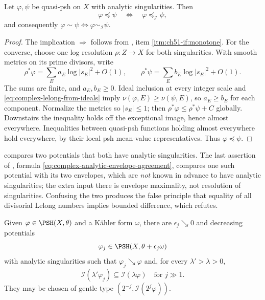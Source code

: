 \begin{proposition}
\label{prop:ch51-analytic-rigid}
Let $\varphi,\psi$ be quasi-psh on $X$ with analytic singularities.
Then
\[
 \varphi\preceq\psi
 \quad\Longleftrightarrow\quad
 \varphi\preceq_{\mathcal I}\psi ,
\]
and consequently $\varphi\sim\psi\iff\varphi\sim_{\mathcal I}\psi$.
\end{proposition}

\begin{proof}
The implication $\Rightarrow$ follows from
, item \cref{itm:ch51-if:monotone}.
For the converse, choose one log resolution $\rho:Z\to X$ for both
singularities.  With smooth metrics on its prime divisors, write
\[
 \rho^*\varphi=\sum_Ea_E\log|s_E|^2+O(1),\qquad
 \rho^*\psi=\sum_Eb_E\log|s_E|^2+O(1).
\]
The sums are finite, and $a_E,b_E\geq0$.  Ideal inclusion at every
integer scale and \eqref{eq:complex-lelong-from-ideals} imply
$\nu(\varphi,E)\geq\nu(\psi,E)$, so $a_E\geq b_E$ for each component.
Normalize the metrics so $|s_E|\leq1$; then
$\rho^*\varphi\leq\rho^*\psi+C$ globally.  Downstairs the inequality
holds off the exceptional image, hence almost everywhere.  Inequalities
between quasi-psh functions holding almost everywhere hold everywhere,
by their local psh mean-value representatives.  Thus
$\varphi\preceq\psi$.
\end{proof}

\begin{remark}
\label{rem:ch51-rigidity}
 compares two potentials that both have
analytic singularities.  The last assertion of
, formula
\eqref{eq:complex-analytic-envelope-agreement}, compares one such
potential with its two envelopes, which are \emph{not} known in advance to
have analytic singularities; the extra input there is envelope maximality,
not resolution of singularities.  Confusing the two produces the false
principle that equality of all divisorial Lelong numbers implies bounded
difference, which  refutes.
\end{remark}

\begin{proposition}\label{prop:complex-quasi-equisingular}
Given $\varphi\in\PSH(X,\theta)$ and a K\"ahler form $\omega$, there
are $\epsilon_j\searrow0$ and decreasing potentials
\[
 \varphi_j\in\PSH(X,\theta+\epsilon_j\omega)
\]
with analytic singularities such that $\varphi_j\searrow\varphi$ and,
for every $\lambda'>\lambda>0$,
\[
 \mathcal I(\lambda'\varphi_j)
          \subseteq\mathcal I(\lambda\varphi)
 \quad\text{for }j\gg1.
\tag{51.14}\label{eq:complex-quasi-equisingular}
\]
They may be chosen of gentle type
$(2^{-j},\mathcal I(2^j\varphi))$.
\end{proposition}

